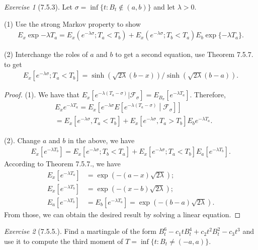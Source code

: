\documentclass[12pt,a4paper]{amsart}
\theoremstyle{plain}
\theoremstyle{definition}
\theoremstyle{remark}
\newtheorem*{exe}{Exercise}
\numberwithin{equation}{section}
\begin{document}
\begin{exe}[7.5.3]
Let $\sigma = \inf\{t: B_t \not\in (a,b)\}$ and let $\lambda > 0$.

(1) Use the strong Markov property to show
\begin{align}
E_x \exp{-\lambda T_a} 
  = E_x \left( e^{-\lambda \sigma}; T_a < T_b \right) + E_x\left( e^{-\lambda \sigma}; T_b < T_a \right) E_b \exp\{- \lambda T_a\}. 
\end{align}

(2) Interchange the roles of $a$ and $b$ to get a second equation, use Theorem 7.5.7. to get
\begin{align}
  E_x\left[ e^{-\lambda \sigma}; T_a < T_b \right]
 = \sinh(\sqrt{2\lambda} (b-x))/\sinh(\sqrt{2\lambda}(b-a)).
\end{align}
\end{exe}
\begin{proof}
(1). We have that $E_x[e^{- \lambda (T_a - \sigma)}| \mathcal F_\sigma] = E_{B_\sigma}[e^{-\lambda T_a}]$. Therefore,
\begin{align}
  &E_x e^{-\lambda T_a} = E_x \left[ e^{-\lambda \sigma} E\left[ e^{-\lambda (T_a - \sigma)} \middle| \mathcal F_\sigma\right]\right]
  \\&= E_x\left[ e^{-\lambda \sigma}, T_a < T_b \right] + E_x[e^{-\lambda \sigma},T_a>T_b] E_b e^{-\lambda T_a}.
\end{align}

(2). Change $a$ and $b$ in the above, we have
\begin{align}
  E_x\left[ e^{-\lambda T_b} \right]
  = E_x\left[ e^{-\lambda \sigma}; T_b < T_a \right] + E_x\left[ e^{-\lambda \sigma}; T_a < T_b \right] E_a[e^{-\lambda T_b}].
\end{align}
According to Theorem 7.5.7., we have 
\begin{align}
  E_x\left[ e^{-\lambda T_a} \right] &= \exp(-(a-x)\sqrt{2\lambda});
  \\E_x\left[ e^{-\lambda T_b} \right] &= \exp(-(x-b)\sqrt{2\lambda});
\\ E_a[e^{-\lambda T_b}] &= E_b[e^{-\lambda T_a}] = \exp(-(b-a)\sqrt{2\lambda}).
\end{align}
From those, we can obtain the desired result by solving a linear equation.
\end{proof}
\begin{exe}[7.5.5.]
Find a martingale of the form $B_t^6 - c_1tB_t^4+c_2t^2B_t^2-c_3t^3$ and use it to compute the third moment of $T = \inf\{t: B_t \neq (-a,a)\}$.
\end{exe}
\end{document}
